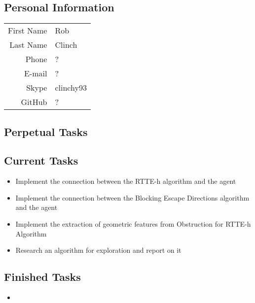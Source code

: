 \subsection{Personal Information}
\begin{table}[h!]
	\begin{tabular}{rl}
	First Name 	& Rob\\
	Last Name	& Clinch\\
	Phone		& ?\\
	E-mail		& ?\\
	Skype		& clinchy93\\
	GitHub		& ?
\end{tabular}
\end{table}

\subsection{Perpetual Tasks}

\subsection{Current Tasks}
\begin{itemize}
	\item Implement the connection between the RTTE-h algorithm and the agent
	\item Implement the connection between the Blocking Escape Directions algorithm and the agent
	\item Implement the extraction of geometric features from Obstruction for RTTE-h Algorithm
	\item Research an algorithm for exploration and report on it
\end{itemize}

\subsection{Finished Tasks}
\begin{itemize}
\item
\end{itemize}